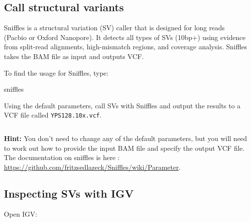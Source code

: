 \documentclass[11pt]{article}
\makeatletter
\newcommand{\boxspacing}{\kern\kvtcb@left@rule\kern\kvtcb@boxsep}
\newcommand{\prompt}[4]{
        {\ttfamily\llap{{\color{blue}\LARGE\faKeyboardO\hspace{3pt}#4}}\vspace{-\baselineskip}}
    }
\makeatother
\begin{document}
    \begin{tcolorbox}[breakable, size=fbox, boxrule=1pt, pad at break*=1mm,colback=cellbackground, colframe=cellborder]
\prompt{In}{incolor}{ }{\boxspacing}
\begin{Verbatim}[commandchars=\\\{\}]

\end{Verbatim}
\end{tcolorbox}

    \hypertarget{call-structural-variants}{%
\subsection{Call structural variants}\label{call-structural-variants}}

Sniffles is a structural variation (SV) caller that is designed for long
reads (Pacbio or Oxford Nanopore). It detects all types of SVs (10bp+)
using evidence from split-read alignments, high-mismatch regions, and
coverage analysis. Sniffles takes the BAM file as input and outputs VCF.

To find the usage for Sniffles, type:

    sniffles

    Using the default parameters, call SVs with Sniffles and output the
results to a VCF file called \texttt{YPS128.10x.vcf}.

    \begin{tcolorbox}[breakable, size=fbox, boxrule=1pt, pad at break*=1mm,colback=cellbackground, colframe=cellborder]
\prompt{In}{incolor}{ }{\boxspacing}
\begin{Verbatim}[commandchars=\\\{\}]

\end{Verbatim}
\end{tcolorbox}

    \textbf{Hint:} You don't need to change any of the default parameters,
but you will need to work out how to provide the input BAM file and
specify the output VCF file. The documentation on sniffles is here :
\url{https://github.com/fritzsedlazeck/Sniffles/wiki/Parameter}.

    \hypertarget{inspecting-svs-with-igv}{%
\subsection{Inspecting SVs with IGV}\label{inspecting-svs-with-igv}}

Open IGV:
\end{document}

